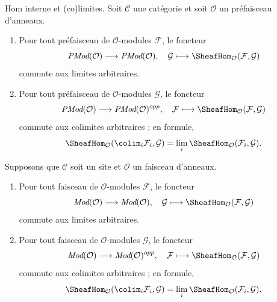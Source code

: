 \begin{lemma}
\label{lemma-internal-hom-commute-limits}
Hom interne et (co)limites.
Soit $\mathcal{C}$ une catégorie et soit $\mathcal{O}$ un préfaisceau
d'anneaux.
\begin{enumerate}
\item Pour tout préfaisceau de $\mathcal{O}$-modules $\mathcal{F}$, le foncteur
$$
\textit{PMod}(\mathcal{O}) \longrightarrow \textit{PMod}(\mathcal{O})
, \quad
\mathcal{G} \longmapsto \SheafHom_\mathcal{O}(\mathcal{F}, \mathcal{G})
$$
commute aux limites arbitraires.
\item Pour tout préfaisceau de $\mathcal{O}$-modules $\mathcal{G}$, le foncteur
$$
\textit{PMod}(\mathcal{O}) \longrightarrow \textit{PMod}(\mathcal{O})^{opp}
, \quad
\mathcal{F} \longmapsto \SheafHom_\mathcal{O}(\mathcal{F}, \mathcal{G})
$$
commute aux colimites arbitraires ; en formule,
$$
\SheafHom_\mathcal{O}(\colim_i \mathcal{F}_i, \mathcal{G})
=
\lim_i \SheafHom_\mathcal{O}(\mathcal{F}_i, \mathcal{G}).
$$
\end{enumerate}
Supposons que $\mathcal{C}$ soit un site et $\mathcal{O}$ un faisceau d'anneaux.
\begin{enumerate}
\item[(3)] Pour tout faisceau de $\mathcal{O}$-modules $\mathcal{F}$, le foncteur
$$
\textit{Mod}(\mathcal{O}) \longrightarrow \textit{Mod}(\mathcal{O})
, \quad
\mathcal{G} \longmapsto \SheafHom_\mathcal{O}(\mathcal{F}, \mathcal{G})
$$
commute aux limites arbitraires.
\item[(4)] Pour tout faisceau de $\mathcal{O}$-modules $\mathcal{G}$, le foncteur
$$
\textit{Mod}(\mathcal{O}) \longrightarrow \textit{Mod}(\mathcal{O})^{opp}
, \quad
\mathcal{F} \longmapsto \SheafHom_\mathcal{O}(\mathcal{F}, \mathcal{G})
$$
commute aux colimites arbitraires ; en formule,
$$
\SheafHom_\mathcal{O}(\colim_i \mathcal{F}_i, \mathcal{G})
=
\lim_i \SheafHom_\mathcal{O}(\mathcal{F}_i, \mathcal{G}).
$$
\end{enumerate}
\end{lemma}

